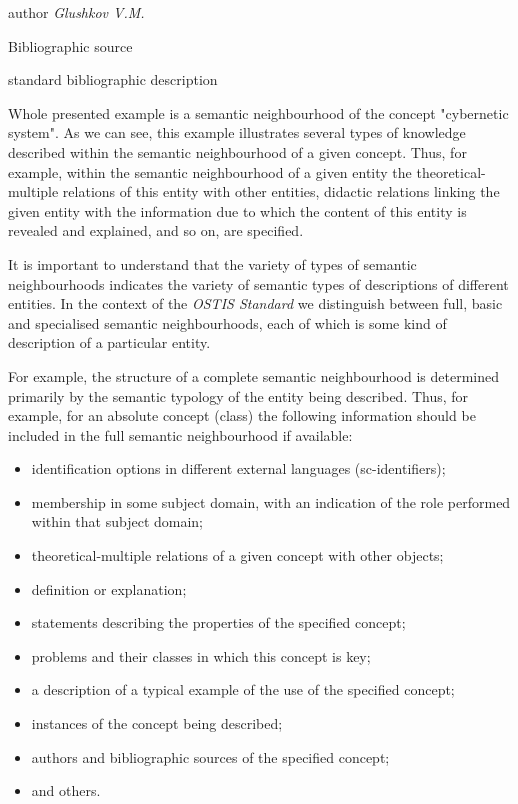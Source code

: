 \documentclass{scndocument}
\begin{document}
\begin{multicols}{2}
\begin{scn}
        \begin{scnrelfromset}{author}
        \textit{Glushkov V.M.}
        \end{scnrelfromset}
        \begin{scnrelfromset}{Bibliographic source}
        \end{scnrelfromset}
        \begin{scnrelfromset}{standard bibliographic description}
        \end{scnrelfromset}
    
    
\end{scn}

 
 

\newline


Whole presented example is a semantic neighbourhood of the concept "cybernetic system". As we can see, this example illustrates several types of knowledge described within the semantic neighbourhood of a given concept.
Thus, for example, within the semantic neighbourhood of a given entity the theoretical-multiple relations of this entity with other entities, didactic relations linking the given entity with the information due to which the
content of this entity is revealed and explained, and so on, are specified.

It is important to understand that the variety of types of semantic  neighbourhoods indicates the variety of semantic types of descriptions of different entities. In the context of the \textit{ OSTIS Standard} we distinguish between full, basic and specialised semantic neighbourhoods, each
of which is some kind of description of a particular entity.

For example, the structure of a complete semantic neighbourhood is determined primarily by the semantic typology of the entity being described. Thus, for example, for an absolute concept (class) the following information should be included in the full semantic neighbourhood if available:
\begin{itemize}
    \item  identification options in different external languages (sc-identifiers);
    \item membership in some subject domain, with an indication of the role performed within that subject domain;
    \item theoretical-multiple relations of a given concept with other objects;
    \item definition or explanation;
    \item statements describing the properties of the specified concept;
    \item problems and their classes in which this concept is key;
    \item a description of a typical example of the use of the specified concept;
    \item  instances of the concept being described;
    \item authors and bibliographic sources of the specified concept;
    \item and others.



\end{itemize}
\end{multicols}
\end{document}
